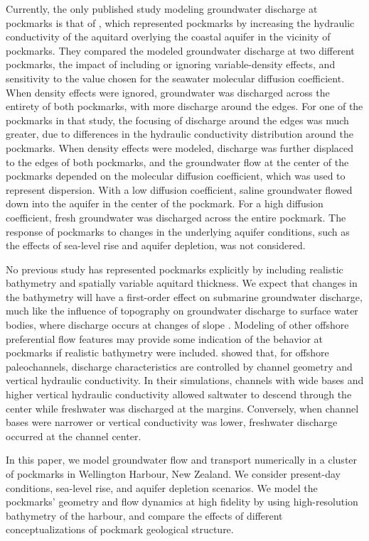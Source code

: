 \documentclass[pdflatex,sn-apa]{sn-jnl}%
\begin{document}
Currently, the only published study modeling groundwater discharge at pockmarks is that of \cite{kaleris_modelling_2002},
which represented pockmarks by increasing the hydraulic conductivity of the aquitard overlying the coastal aquifer in the vicinity of pockmarks.
They compared the modeled groundwater discharge at two different pockmarks, the impact of including or ignoring variable-density effects,
and sensitivity to the value chosen for the seawater molecular diffusion coefficient.
When density effects were ignored, groundwater was discharged across the entirety of both pockmarks, with more discharge around the edges.
For one of the pockmarks in that study, the focusing of discharge around the edges was much greater, due to differences in the hydraulic conductivity distribution around the pockmarks.
When density effects were modeled, discharge was further displaced to the edges of both pockmarks, and the groundwater flow at the center of the pockmarks depended on the molecular diffusion coefficient, which was used to represent dispersion.
With a low diffusion coefficient, saline groundwater flowed down into the aquifer in the center of the pockmark.
For a high diffusion coefficient, fresh groundwater was discharged across the entire pockmark.
The response of pockmarks to changes in the underlying aquifer conditions, such as the effects of sea-level rise and aquifer depletion, was not considered.

No previous study has represented pockmarks explicitly by including realistic bathymetry and spatially variable aquitard thickness.
We expect that changes in the bathymetry will have a first-order effect on submarine groundwater discharge,
much like the influence of topography on groundwater discharge to surface water bodies, where discharge occurs at changes of slope \citep{winter_relation_1999}.
Modeling of other offshore preferential flow features may provide some indication of the behavior at pockmarks if realistic bathymetry were included.
\cite{mulligan_role_2007} showed that, for offshore paleochannels, discharge characteristics are controlled by channel geometry and vertical hydraulic conductivity.
In their simulations, channels with wide bases and higher vertical hydraulic conductivity allowed saltwater to descend through the center while freshwater was discharged at the margins.
Conversely, when channel bases were narrower or vertical conductivity was lower, freshwater discharge occurred at the channel center.

In this paper, we model groundwater flow and transport numerically in a cluster of pockmarks in Wellington Harbour, New Zealand.
We consider present-day conditions, sea-level rise, and aquifer depletion scenarios.
We model the pockmarks' geometry and flow dynamics at high fidelity by using high-resolution bathymetry of the harbour,
and compare the effects of different conceptualizations of pockmark geological structure.
\end{document}
